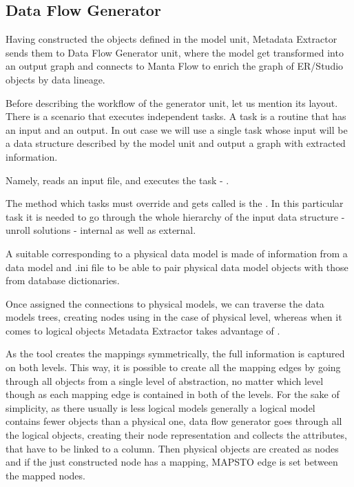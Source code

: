 \subsection{Data Flow Generator}

Having constructed the objects defined in the model unit, Metadata Extractor sends them to Data Flow Generator unit, where the model get transformed into an output graph and connects to Manta Flow to enrich the graph of ER/Studio objects by data lineage.

Before describing the workflow of the generator unit, let us mention its layout.
There is a scenario that executes independent tasks. A task is a routine that has an input and an output. In out case we will use a single task whose input will be a data structure described by the model unit and output a graph with extracted information.

 Namely,  reads an input file, and executes the task - . 
 
 The method which tasks must override and gets called is the . In this particular task it is needed to go through the whole hierarchy of the input data structure -  unroll solutions - internal as well as external.

A suitable  corresponding to a physical data model is made of information from a data model and .ini file to be able to pair physical data model objects with those from database dictionaries.

Once assigned the connections to physical models, we can traverse the data models trees, creating nodes using  in the case of physical level, whereas when it comes to logical objects Metadata Extractor takes advantage of .

As the tool creates the mappings symmetrically, the full information is captured on both levels. This way, it is possible to create all the mapping edges by going through all objects from a single level of abstraction, no matter which level though as each mapping edge is contained in both of the levels.
For the sake of simplicity, as there usually is less logical models generally a logical model contains fewer objects than a physical one, data flow generator goes through all the logical objects, creating their node representation and collects the attributes, that have to be linked to a column.
Then physical objects are created as nodes and if the just constructed node has a mapping, MAPS\textunderscore TO edge is set between the mapped nodes.


